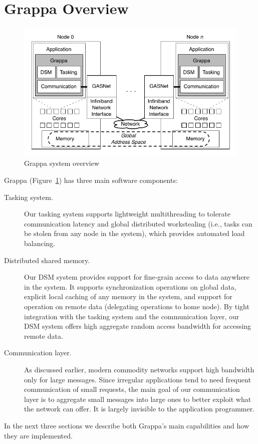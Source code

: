 \section{Grappa Overview}

\begin{figure}[t]
\begin{center}
  \includegraphics[width=0.95\columnwidth]{figs/system-overview}
\begin{minipage}{0.95\columnwidth}
  \caption{\label{fig:grappa} Grappa system overview}
\end{minipage}
\vspace{-3ex}
\end{center}
\end{figure}


Grappa (Figure~\ref{fig:grappa}) has three main software components:
\begin{description}

\item [Tasking system.] Our tasking system supports lightweight
multithreading to tolerate communication latency and global distributed
workstealing (i.e., tasks can be stolen from any node in the system), which
provides automated load balancing.

\item[Distributed shared memory.] Our DSM system provides support for
fine-grain access to data anywhere in the system. It supports synchronization
operations on global data, explicit local caching of any memory in the system,
and support for operation on remote data (delegating operations to home node).
By tight integration with the tasking system and the
communication layer, our DSM system offers high aggregate random
access bandwidth for accessing remote data.

\item[Communication layer.] As discussed earlier, modern commodity networks
support high bandwidth only for large messages. Since irregular applications
tend to need frequent communication of small requests, the main goal of our
communication layer is to aggregate small messages into large ones to better
exploit what the network can offer. It is largely invisible to the application
programmer.


\end{description}

In the next three sections we describe both Grappa's main capabilities and how they are implemented.

